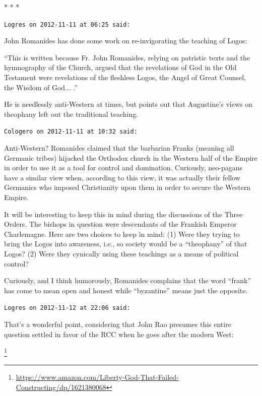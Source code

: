 
\begin{center}* * *\end{center}

\begin{footnotesize}
\begin{sffamily}
\texttt{Logres on 2012-11-11 at 06:25 said:}

John Romanides has done some work on re-invigorating the teaching of Logos:

``This is written because Fr. John Romanides, relying on patristic texts and the hymnography of the Church, argued that the revelations of God in the Old Testament were revelations of the fleshless Logos, the Angel of Great Counsel, the Wisdom of God... .''

He is needlessly anti-Western at times, but points out that Augustine's views on theophany left out the traditional teaching.

\hfill

\texttt{Cologero on 2012-11-11 at 10:32 said:}

Anti-Western? Romanides claimed that the barbarian Franks (meaning all Germanic tribes) hijacked the Orthodox church in the Western half of the Empire in order to use it as a tool for control and domination. Curiously, neo-pagans have a similar view when, according to this view, it was actually their fellow Germanics who imposed Christianity upon them in order to secure the Western Empire.

It will be interesting to keep this in mind during the discussions of the Three Orders. The bishops in question were descendants of the Frankish Emperor Charlemagne. Here are two choices to keep in mind: (1) Were they trying to bring the Logos into awareness, i.e., so society would be a ``theophany'' of that Logos? (2) Were they cynically using these teachings as a means of political control?

Curiously, and I think humorously, Romanides complains that the word ``frank'' has come to mean open and honest while ``byzantine'' means just the opposite.

\hfill

\texttt{Logres on 2012-11-12 at 22:06 said:}

That's a wonderful point, considering that John Rao presumes this entire question settled in favor of the RCC when he goes after the modern West:

\footnote{\url{https://www.amazon.com/Liberty-God-That-Failed-Constructing/dp/1621380068}}


\end{sffamily}
\end{footnotesize}
